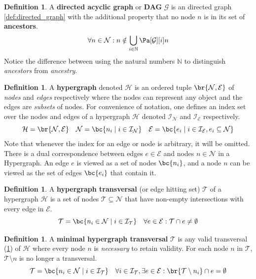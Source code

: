 \documentclass[aps, 10pt, english, twoside, pra, nofootinbib, longbibliography]{revtex4-1}
\theoremstyle{plain}
\theoremstyle{definition}
\newtheorem{definition}[theorem]{Definition}
\theoremstyle{remark}
\newcommand{\hgraph}{\mathcal{H}}
\newcommand{\graph}{\mathcal{G}}
\newcommand{\nodes}{\mathcal{N}}
\newcommand{\edges}{\mathcal{E}}
\newcommand{\trans}{\mathcal{T}}
\newcommand{\ind}{\mathcal{I}}
\newcommand{\term}[1]{\textcolor{Mahogany}{\textbf{#1}}}
\begin{document}
    \begin{definition}
        \label{def:dag}
        A \term{directed acyclic graph} or \term{DAG} $\graph$ is an directed graph \cref{def:directed_graph} with the additional property that no node $n$ is in its set of \term{ancestors}.
        \[ \forall n \in \nodes : n \notin \bigcup_{i\in\mathbb{N}} \Pa[\graph][i]{n}\]
        Notice the difference between using the natural numbers $\mathbb{N}$ to distinguish \textit{ancestors} from \textit{ancestry}.
    \end{definition}

    \begin{definition}
        \label{def:hypergraph}
        A \term{hypergraph} denoted $\hgraph$ is an ordered tuple $\br{\nodes, \edges}$ of \textit{nodes} and \textit{edges} respectively where the nodes can represent any object and the edges are \textit{subsets} of nodes. For convenience of notation, one defines an index set over the nodes and edges of a hypergraph $\hgraph$ denoted $\ind_\nodes$ and $\ind_\edges$ respectively.
        \[ \hgraph = \br{\nodes, \edges} \quad \nodes = \bc{n_i \mid i \in \ind_\nodes} \quad \edges = \bc{e_i \mid i \in \ind_\edges, e_i \subseteq \nodes} \]
        Note that whenever the index for an edge or node is arbitrary, it will be omitted. There is a dual correspondence between edges $e \in \edges$ and nodes $n \in \nodes$ in a Hypergraph. An edge $e$ is viewed as a set of nodes $\bc{n_i}$, and a node $n$ can be viewed as the set of edges $\bc{e_i}$ that contain it.
    \end{definition}

    \begin{definition}
        \label{def:hgraph_trans}
        A \term{hypergraph transversal} (or edge hitting set) $\trans$ of a hypergraph $\hgraph$ is a set of nodes $\trans \subseteq \nodes$ that have non-empty intersections with every edge in $\edges$.
        \[ \trans = \bc{n_i \in \nodes \mid i \in \ind_\trans } \quad \forall e \in \edges : \trans \cap e \neq \emptyset \]
    \end{definition}

    \begin{definition}
        A \term{minimal hypergraph transversal} $\trans$ is any valid transversal (\cref{def:hgraph_trans}) of $\hgraph$ where every node $n$ is \textit{necessary} to retain validity. For each node $n$ in $\trans$, $\trans \setminus n$ is no longer a transversal.
        \[ \trans = \bc{n_i \in \nodes \mid i \in \ind_\trans } \quad \forall i \in \ind_\trans, \exists e \in \edges : \br{\trans \setminus n_i} \cap e = \emptyset \]
    \end{definition}
\end{document}
